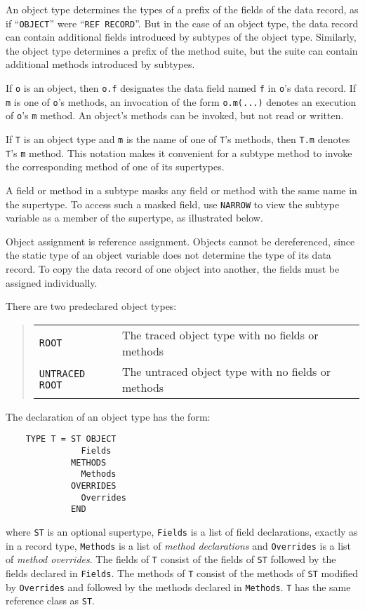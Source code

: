 \documentclass[10pt]{article}
\begin{document}
An object type determines the types of a prefix of the fields of the data
record, as if ``\verb|OBJECT|'' were ``\verb|REF RECORD|''.  But in the case
of an object type, the data record can contain additional fields introduced by
subtypes of the object type.  Similarly, the object type determines a prefix
of the method suite, but the suite can contain additional methods introduced
by subtypes.

If \verb|o| is an object, then \verb|o.f| designates the data field named
\verb|f| in \verb|o|'s data record.  If \verb|m| is one of \verb|o|'s methods,
an invocation of the form \verb|o.m(...)| denotes an execution of \verb|o|'s
\verb|m| method.  An object's methods can be invoked, but not read or written.

If \verb|T| is an object type and \verb|m| is the name of one of \verb|T|'s
methods, then \verb|T.m| denotes \verb|T|'s \verb|m| method.  This notation
makes it convenient for a subtype method to invoke the corresponding method of
one of its supertypes.

A field or method in a subtype masks any field or method with the same name in
the supertype.  To access such a masked field, use \verb|NARROW| to view the
subtype variable as a member of the supertype, as illustrated below.

Object assignment is reference assignment.  Objects cannot be dereferenced,
since the static type of an object variable does not determine the type of its
data record.  To copy the data record of one object into another, the fields
must be assigned individually.

There are two predeclared object types:
\begin{quote}
  \begin{tabular}{ll}
    \verb|ROOT|          & The traced object type with no fields or methods \\
    \verb|UNTRACED ROOT| & The untraced object type with no fields or methods \\
  \end{tabular}
\end{quote}

The declaration of an object type has the form:
\begin{verbatim}
    TYPE T = ST OBJECT
               Fields
             METHODS
               Methods
             OVERRIDES
               Overrides
             END
\end{verbatim}
where \verb|ST| is an optional supertype, \verb|Fields| is a list of field
declarations, exactly as in a record type, \verb|Methods| is a list of
\emph{method declarations} and \verb|Overrides| is a list of \emph{method
  overrides}.  The fields of \verb|T| consist of the fields of \verb|ST|
followed by the fields declared in \verb|Fields|.  The methods of \verb|T|
consist of the methods of \verb|ST| modified by \verb|Overrides| and followed
by the methods declared in \verb|Methods|.  \verb|T| has the same reference
class as \verb|ST|.
\end{document}
